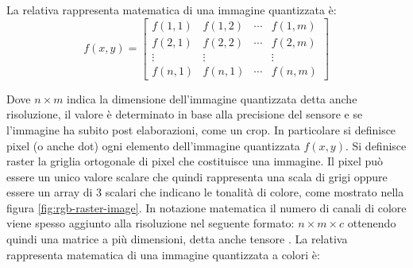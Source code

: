 La relativa rappresenta matematica di una immagine quantizzata è:
\[ f(x, y)=\left[\begin{array}{cccc}f(1,1) & f(1,2) & \cdots & f(1, m) \\ f(2,1) & f(2,2) & \cdots & f(2, m) \\ \vdots & \vdots & & \vdots \\ f(n,1) & f(n,1) & \cdots & f(n,m)\end{array}\right] \]

Dove \(n\times m\) indica la dimensione dell'immagine quantizzata detta anche risoluzione, il valore è determinato in base alla precisione del sensore e se l'immagine ha subito post elaborazioni, come un crop. In particolare si definisce pixel  (o anche dot) ogni elemento dell'immagine quantizzata \(f(x, y)\). Si definisce raster la griglia ortogonale di pixel che costituisce una immagine. Il pixel può essere un unico valore scalare che quindi rappresenta una scala di grigi oppure essere un array di 3 scalari che indicano le tonalità di colore, come mostrato nella figura \cref{fig:rgb-raster-image}. In notazione matematica il numero di canali di colore viene spesso aggiunto alla risoluzione nel seguente formato: \(n\times m \times c\) ottenendo quindi una matrice a più dimensioni, detta anche tensore \cite{gonzalez_dip}. La relativa rappresenta matematica di una immagine quantizzata a colori è:

